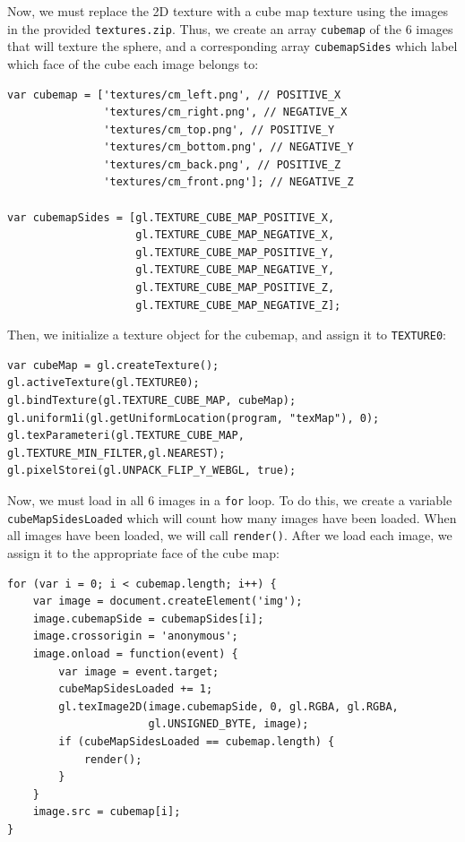 \documentclass[12pt]{article}
\begin{document}
Now, we must replace the 2D texture with a cube map texture using the images in the provided \texttt{textures.zip}. Thus, we create an array \texttt{cubemap} of the 6 images that will texture the sphere, and a corresponding array \texttt{cubemapSides} which label which face of the cube each image belongs to:


\begin{verbatim}
var cubemap = ['textures/cm_left.png', // POSITIVE_X
               'textures/cm_right.png', // NEGATIVE_X
               'textures/cm_top.png', // POSITIVE_Y
               'textures/cm_bottom.png', // NEGATIVE_Y
               'textures/cm_back.png', // POSITIVE_Z
               'textures/cm_front.png']; // NEGATIVE_Z 
               
var cubemapSides = [gl.TEXTURE_CUBE_MAP_POSITIVE_X,
                    gl.TEXTURE_CUBE_MAP_NEGATIVE_X,
                    gl.TEXTURE_CUBE_MAP_POSITIVE_Y,
                    gl.TEXTURE_CUBE_MAP_NEGATIVE_Y,
                    gl.TEXTURE_CUBE_MAP_POSITIVE_Z,
                    gl.TEXTURE_CUBE_MAP_NEGATIVE_Z];
\end{verbatim}

Then, we initialize a texture object for the cubemap, and assign it to \texttt{TEXTURE0}:

\begin{verbatim}
var cubeMap = gl.createTexture();
gl.activeTexture(gl.TEXTURE0);
gl.bindTexture(gl.TEXTURE_CUBE_MAP, cubeMap);
gl.uniform1i(gl.getUniformLocation(program, "texMap"), 0);
gl.texParameteri(gl.TEXTURE_CUBE_MAP, gl.TEXTURE_MIN_FILTER,gl.NEAREST);
gl.pixelStorei(gl.UNPACK_FLIP_Y_WEBGL, true);
\end{verbatim}

Now, we must load in all 6 images in a \texttt{for} loop. To do this, we create a variable \texttt{cubeMapSidesLoaded} which will count how many images have been loaded. When all images have been loaded, we will call \texttt{render()}. After we load each image, we assign it to the appropriate face of the cube map:

\begin{verbatim}
for (var i = 0; i < cubemap.length; i++) {
    var image = document.createElement('img');
    image.cubemapSide = cubemapSides[i];
    image.crossorigin = 'anonymous';
    image.onload = function(event) {
        var image = event.target;
        cubeMapSidesLoaded += 1;
        gl.texImage2D(image.cubemapSide, 0, gl.RGBA, gl.RGBA,
                      gl.UNSIGNED_BYTE, image);
        if (cubeMapSidesLoaded == cubemap.length) {
            render();
        }
    }
    image.src = cubemap[i];
}
\end{verbatim}
\end{document}
